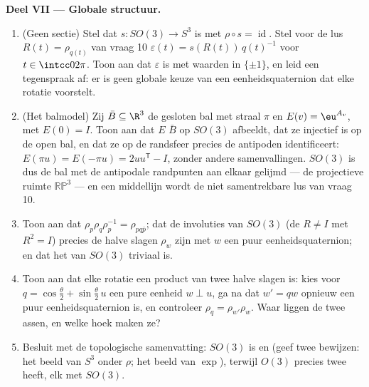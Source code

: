 \begin{problem}
\medskip
\noindent\textbf{Deel VII --- Globale structuur.}
\begin{enumerate}[resume]
  \item (Geen  sectie) Stel dat $s \colon SO(3) \to S^3$
         is met $\rho \circ s = \operatorname{id}$. Stel
        voor de lus $R(t) = \rho_{q(t)}$ van vraag 10
        $\varepsilon(t) = s(R(t))\,q(t)^{-1}$ voor $t \in
        \intcc0{2\pi}$. Toon aan dat $\varepsilon$  is met
        waarden in $\{\pm1\}$, en leid een tegenspraak af: er is
        geen  globale keuze van een eenheidsquaternion
        dat elke rotatie voorstelt.
  \item (Het balmodel) Zij $\bar B \subseteq \R^3$ de gesloten
        bal met straal $\pi$ en $E(v) = \eu^{A_v}$, met $E(0) =
        I$. Toon aan dat $E$ $\bar B$ op $SO(3)$ afbeeldt, dat ze
        injectief is op de open bal, en dat ze op de randsfeer
        precies de antipoden identificeert: $E(\pi u) = E(-\pi u)
        = 2uu^{\mathsf T} - I$, zonder andere samenvallingen.
        $SO(3)$ is dus de bal met de antipodale randpunten aan
        elkaar gelijmd --- de projectieve ruimte
        $\mathbb{RP}^3$ --- en een middellijn wordt de niet
        samentrekbare lus van vraag 10.
  \item Toon aan dat $\rho_p\rho_q\rho_p^{-1} = \rho_{pq\bar
        p}$; dat de involuties van $SO(3)$ (de $R \neq I$ met
        $R^2 = I$) precies de halve slagen $\rho_w$ zijn met $w$
        een puur eenheidsquaternion; en dat het  van
        $SO(3)$ triviaal is.
  \item Toon aan dat elke rotatie een product van twee halve
        slagen is: kies voor $q = \cos\frac\theta2 +
        \sin\frac\theta2\,u$ een pure eenheid $w \perp u$, ga na
        dat $w' = qw$ opnieuw een puur eenheidsquaternion is, en
        controleer $\rho_q = \rho_{w'}\rho_w$. Waar liggen de
        twee assen, en welke hoek maken ze?
  \item Besluit met de topologische samenvatting: $SO(3)$ is
         en  (geef twee bewijzen: het
         beeld van $S^3$ onder $\rho$; het beeld van
        $\exp$), terwijl $O(3)$ precies twee 
        heeft, elk  met $SO(3)$.


\end{enumerate}
\end{problem}
